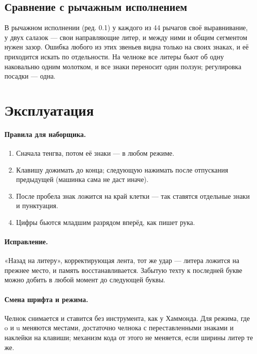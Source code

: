 \subsection{Сравнение с рычажным исполнением}

В рычажном исполнении (ред. 0.1) у каждого из 44 рычагов своё выравнивание, у двух салазок — свои направляющие литер, и между ними и общим сегментом нужен зазор. Ошибка любого из этих звеньев видна только на своих знаках, и её приходится искать по отдельности. На челноке все литеры бьют об одну наковальню одним молотком, и все знаки переносит один ползун; регулировка посадки — одна.

\section{Эксплуатация}

\paragraph{Правила для наборщика.}
\begin{enumerate}
  \item Сначала тенгва, потом её знаки — в любом режиме.
  \item Клавишу дожимать до конца; следующую нажимать после отпускания предыдущей (машинка сама не даст иначе).
  \item После пробела знак ложится на край клетки — так ставятся отдельные знаки и пунктуация.
  \item Цифры бьются младшим разрядом вперёд, как пишет рука.
\end{enumerate}

\paragraph{Исправление.} «Назад на литеру», корректирующая лента, тот же удар — литера ложится на прежнее место, и память восстанавливается. Забытую техту к последней букве можно добить в любой момент до следующей буквы.

\paragraph{Смена шрифта и режима.} Челнок снимается и ставится без инструмента, как у Хаммонда. Для режима, где o и u меняются местами, достаточно челнока с переставленными знаками и наклейки на клавиши; механизм кода от этого не меняется, если ширины литер те же.

